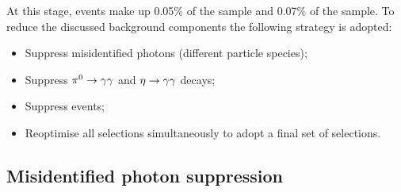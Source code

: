 At this stage, \BtoXsgamma events make up 0.05\% of the \FEI \Bp sample and 0.07\% of the \FEI \Bz sample.
To reduce the discussed background components the following strategy is adopted:
\begin{itemize}
    \item Suppress misidentified photons (different particle species);
    \item Suppress $\pi^0\rightarrow\gamma\gamma$ and $\eta\rightarrow\gamma\gamma$ decays;
    \item Suppress \epem\ra\qqbar events;
    \item Reoptimise all selections simultaneously to adopt a final set of selections.
\end{itemize}

\subsection{Misidentified photon suppression}\label{sec:selection_clusZMVA}

